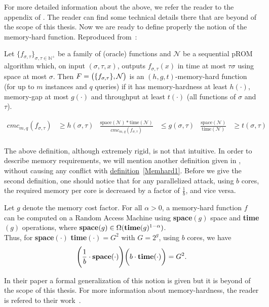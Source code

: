 For more detailed information about the above, we refer the reader to the appendix of \cite{cryptoeprint:2016:875}. The reader can find some technical details there that are beyond of the scope of this thesis. Now we are ready to define properly the notion of the memory-hard function. Reproduced from~\cite{cryptoeprint:2016:875}:
\pagebreak

\begin{definition} \label{Memhard1}
  Let $\{ f_{\sigma, \tau} \}_{\sigma, \tau \in \mathbb{N}^{+}}$ be a family of (oracle) functions and $\mathcal{N}$ be a sequential pROM algorithm which, on input $(\sigma, \tau, x)$, outputs $f_{\sigma, \tau}(x)$ in time at most $\tau \sigma$ using space at most $\sigma$. Then $F=\big{(} \{ f_{\sigma,\tau} \}, \mathcal{N} \big{)}$
  is an $(h,g,t)$-memory-hard function (for up to $m$ instances and $q$ queries) if it has memory-hardness at least $h(\cdot)$, memory-gap at most $g(\cdot)$ and throughput at least $t(\cdot)$ (all functions of $\sigma$ and $\tau$).

\begin{align*}
cmc_{m,q}(f_{\sigma, \tau})&\geq h(\sigma, \tau)           &  \frac{\mbox{space}(\mathcal{N})*\mbox{time}(\mathcal{N})}{cmc_{m,q}(f_{\sigma, \tau})} &\leq g(\sigma, \tau)             &  \frac{\mbox{space}(\mathcal{N})}{\mbox{time}(\mathcal{N})} &\geq t(\sigma, \tau)\\
\end{align*}
%
\end{definition}

The above definition, although extremely rigid, is not that intuitive. In order to describe memory requirements, we will mention another definition given in \cite{ForlerLW13}, without causing any conflict with \hyperref[Memhard1]{definition}~\ref{Memhard1}. Before we give the second definition, one should notice that for any parallelized attack, using $b$ cores, the required memory per core is decreased by a factor of $\frac{1}{b}$, and vice versa.

\begin{definition}
  Let $g$ denote the memory cost factor. For all $\alpha > 0$, a memory-hard function $f$ can be computed on a Random Access Machine using \textbf{space}$(g)$ space and \textbf{time}$(g)$ operations, where \textbf{space}$(g) \in \Omega(\mbox{\textbf{time}}(g)^{1-\alpha})$.\\

  \noindent Thus, for \textbf{space}$(\cdot)$ \textbf{time}$(\cdot)$\:$=G^2$ with $G=2^g$, using $b$ cores, we have
  \begin{equation}\label{eqn:memhard}
    \Bigg{(} \frac{1}{b} \cdot \mbox{\textbf{space}}(\cdot) \Bigg{)} \bigg{(} b \cdot \mbox{\textbf{time}}(\cdot) \bigg{)} = G^2.
  \end{equation}
\end{definition}
In their paper a formal generalization of this notion is given but it is beyond of the scope of this thesis. For more information about memory-hardness, the reader is refered to their work~\cite{ForlerLW13}.
%
